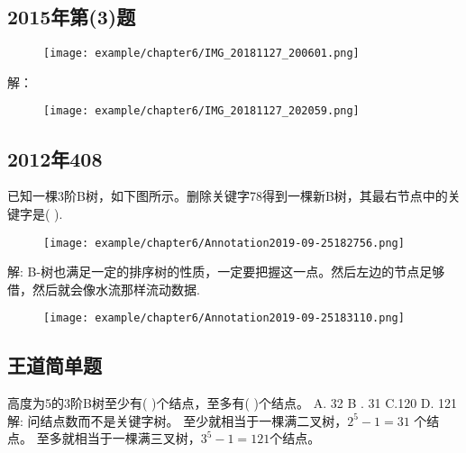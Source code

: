 \subsection{2015年第(3)题}

\begin{figure}[H]
	\centering  %
	\texttt{[image: example/chapter6/IMG\_20181127\_200601.png]}
\end{figure}

解：\newline
\begin{figure}[H]
	\centering  %
	\texttt{[image: example/chapter6/IMG\_20181127\_202059.png]}
\end{figure}

\subsection{2012年408}
已知一棵3阶B树，如下图所示。删除关键字78得到一棵新B树，其最右节点中的关键字是(  ).\newline
\begin{figure}[H]
	\centering  %
	\texttt{[image: example/chapter6/Annotation2019-09-25182756.png]}
\end{figure}
解:\newline
B-树也满足一定的排序树的性质，一定要把握这一点。然后左边的节点足够借，然后就会像水流那样流动数据.\newline
\begin{figure}[H]
	\centering  %
	\texttt{[image: example/chapter6/Annotation2019-09-25183110.png]}
\end{figure}

\subsection{王道简单题}
高度为5的3阶B树至少有(  )个结点，至多有(   )个结点。\newline
A. 32 B . 31 C.120 D. 121\newline
解:\newline
问结点数而不是关键字树。\newline
至少就相当于一棵满二叉树，$2^5 - 1 = 31$ 个结点。\newline
至多就相当于一棵满三叉树，$3^5 - 1 = 121$个结点。\newline
